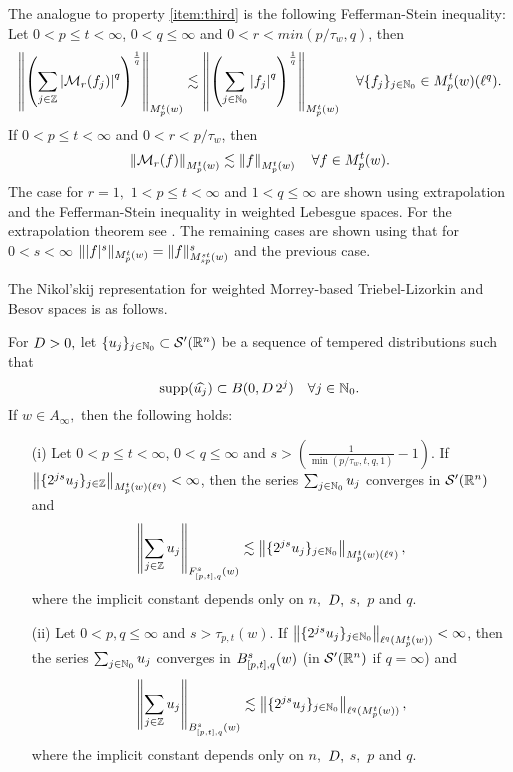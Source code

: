 The analogue to property \ref{item:third} is the following Fefferman-Stein inequality:
Let $0<p\leq t<\infty$, $0<q\leq\infty$ and $0<r<min(p/\tau_w,q)$, then
\begin{equation}\label{eq:FTMorrey}
\norm{\left(\sum_{j\in\ent} \abs{\M_r(f_j)}^q\right)^{\frac{1}{q}}}{\mow{p}{t}{w}}\lesssim \norm{\left(\sum_{j\in\na_0} \abs{f_j}^q\right)^{\frac{1}{q}}}{\mow{p}{t}{w}}\quad \forall \{f_j\}_{j\in \na_0}\in \mow{p}{t}{w}(\ell^q).
\end{equation}
If $0<p\leq t <\infty$ and $0<r<p/\tau_w$, then 
\begin{equation*}
\norm{\M_r(f)}{\mow{p}{t}{w}}\lesssim \norm{f}{\mow{p}{t}{w}}\quad \forall f\in \mow{p}{t}{w}. 
\end{equation*}
The case for $r=1,$ $1<p\le t<\infty$ and $1<q\le \infty$ are shown using extrapolation and the Fefferman-Stein inequality in weighted Lebesgue spaces. For the extrapolation theorem see \cite[Theorem 5.3]{MR3538648}. The remaining cases are shown using that for $0<s<\infty$ $\| |f|^s \|_{\mow{p}{t}{w}} = \|f\|^s_{\mow{sp}{st}{w}}$ and the previous case.

The Nikol'skij representation for weighted Morrey-based Triebel-Lizorkin and Besov spaces is as follows.
\begin{theorem}\label{thm:Nikolskij:Morrey:weighted} For $\A> 0,$ let $\{u_j\}_{j \in \naz} \subset \mathcal{S}'(\rn)$ be a sequence of tempered distributions such that
\begin{equation*}
\supp(\widehat{u_j}) \subset B(0, \A\, 2^j ) \quad \forall j \in \naz.
\end{equation*}
If $w\in A_\infty,$ then the following holds:  
\begin{enumerate}
\item[(i)]\label{item:thh:Nikolskij:Morrey:TL} Let $0 < p \leq t < \infty$, $0 < q \leq \infty$ and $s > \left(\frac{1}{\min(p/\tau_w,t,q,1)} - 1 \right)$. If $\norm{\{2^{js} u_j\}_{j\in\ent}}{\mow{p}{t}{w}(\ell^{q})} < \infty$, then the series $\sum_{j \in \naz} u_j$ converges in $\mathcal{S}'(\rn)$ and 
\begin{equation*}
\norm{\sum_{j \in \ent} u_j}{\itlw{[p,t]}{s}{q}{w}} \lesssim  \norm{\{2^{js} u_j\}_{j\in\naz}}{\mow{p}{t}{w}(\ell^{q})},
\end{equation*}
where the implicit constant depends only on $n,$ $\A,$ $s,$ $p$ and  $q.$
\item[(ii)]\label{item:thh:Nikolskij:Morrey:B} Let $0 < p, q \leq \infty$ and $s > \tau_{p,t}(w)$. If $\norm{\{2^{js} u_j\}_{j\in\naz}}{\ell^{q}(\mow{p}{t}{w})} < \infty$, then the series $\sum_{j \in \naz} u_j$ converges in  $\ibesw{[p,t]}{s}{q}{w}$ (in $\mathcal{S}'(\rn)$ if $q=\infty$) and 
\begin{equation*}
\norm{\sum_{j \in \ent} u_j}{\ibesw{[p,t]}{s}{q}{w}} \lesssim  \norm{\{2^{js} u_j\}_{j\in\naz}}{\ell^{q}(\mow{p}{t}{w})},
\end{equation*}
where the implicit constant depends only on $n,$ $\A,$ $s,$ $p$ and $q.$
\end{enumerate}
\end{theorem}

